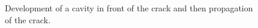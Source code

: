 \begin{figure}
\begin{minipage}[b]{0.19\linewidth}
\end{minipage}
\begin{minipage}[b]{0.19\linewidth}
\end{minipage}
\caption{Development of a cavity in front of the crack and then propagation of the crack.}
\end{figure}


